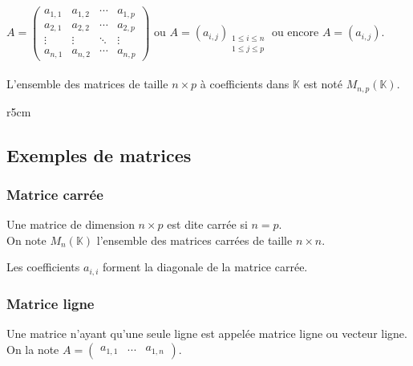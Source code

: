 \documentclass[a4paper,10pt]{book} %
\newcommand{\K}{\mathbb{K}}
\begin{document}
$A=\begin{pmatrix}
a_{1,1} & a_{1,2} & \cdots & a_{1,p} \\
a_{2,1} & a_{2,2} & \cdots & a_{2,p} \\
\vdots & \vdots & \ddots & \vdots \\
a_{n,1} & a_{n,2} & \cdots & a_{n,p}
\end{pmatrix}$ ou $A=(a_{i,j})_{\substack{1\leq i \leq n \\ 1\leq j\leq p}}$ ou encore $A=(a_{i,j})$.\\\\

L'ensemble des matrices de taille $n\times p$ à coefficients dans $\K$ est noté $M_{n,p}(\K)$.

\begin{wrapfigure}[0]{r}{5cm}  \end{wrapfigure}

\subsection{Exemples de matrices}
\subsubsection{Matrice carrée}
Une matrice de dimension $n\times p$ est dite carrée si $n=p$.\\
On note $M_{n}(\K)$ l'ensemble des matrices carrées de taille $n\times n$.

Les coefficients $a_{i,i}$ forment la diagonale de la matrice carrée.

\subsubsection{Matrice ligne}
Une matrice n'ayant qu'une seule ligne est appelée matrice ligne ou vecteur ligne.\\
On la note $A=\begin{pmatrix} a_{1,1} & ... & a_{1,n} \end{pmatrix}$.
\end{document}
